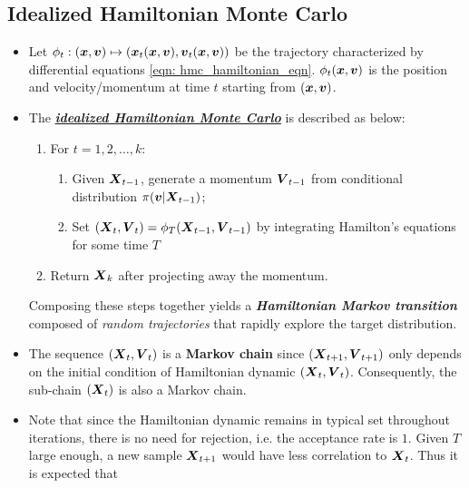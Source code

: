 \documentclass[11pt]{article}
\begin{document}
\subsection{Idealized Hamiltonian Monte Carlo}
\begin{itemize}
\item Let $\phi_t : (\boldsymbol{x}, \boldsymbol{v}) \mapsto (\boldsymbol{x}_t(\boldsymbol{x}, \boldsymbol{v}), \boldsymbol{v}_t(\boldsymbol{x}, \boldsymbol{v}))$ be the trajectory characterized by differential equations \eqref{eqn: hmc_hamiltonian_eqn}. $\phi_t(\boldsymbol{x}, \boldsymbol{v})$ is the position and velocity/momentum at time $t$ starting from $(\boldsymbol{x}, \boldsymbol{v})$. 

\item The \underline{\emph{\textbf{idealized Hamiltonian Monte Carlo}}} \citep{betancourt2017conceptual, vishnoi2021introduction} is described as below:

\begin{enumerate}
\item For $t=1,2,\ldots, k$:
\begin{enumerate}
\item Given $\boldsymbol{X}_{t-1}$, generate a momentum $\boldsymbol{V}_{t-1}$ from conditional distribution $\pi(\boldsymbol{v}|\boldsymbol{X}_{t-1})$;
\item Set $(\boldsymbol{X}_{t}, \boldsymbol{V}_{t}) = \phi_{T}(\boldsymbol{X}_{t-1}, \boldsymbol{V}_{t-1})$ by integrating Hamilton’s equations for some time $T$
\end{enumerate}

\item Return $\boldsymbol{X}_{k}$ after projecting away the momentum.
\end{enumerate}
Composing these steps together yields a \emph{\textbf{Hamiltonian Markov transition}} composed of \emph{random trajectories} that rapidly explore the target distribution.

\item The sequence $(\boldsymbol{X}_{t}, \boldsymbol{V}_{t})$ is a \textbf{Markov chain} since $(\boldsymbol{X}_{t+1}, \boldsymbol{V}_{t+1})$ only depends on the initial condition of Hamiltonian dynamic $(\boldsymbol{X}_{t}, \boldsymbol{V}_{t})$. Consequently, the sub-chain $(\boldsymbol{X}_{t})$ is also a Markov chain.

\item Note that since the Hamiltonian dynamic remains in typical set throughout iterations, there is no need for rejection, i.e. the acceptance rate is $1$. Given $T$ large enough, a new sample $\boldsymbol{X}_{t+1}$ would have less correlation to $\boldsymbol{X}_{t}$. Thus it is expected that 
\end{itemize}
\end{document}
